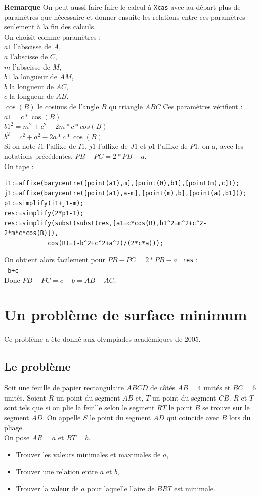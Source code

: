 \documentclass[a4paper,11pt]{book}
\begin{document}
{\bf Remarque}
On peut aussi faire faire le calcul \`a {\tt Xcas} avec au d\'epart plus de 
param\`etres que n\'ecessaire et donner ensuite les relations entre ces 
param\`etres seulement \`a la fin des calculs.\\
On choisit comme param\`etres :\\
$a1$ l'abscisse de $A$,\\
$a$ l'abscisse de $C$,\\
$m$ l'abscisse de $M$,\\
$b1$ la longueur de $AM$,\\
$b$ la longueur de $AC$,\\
$c$ la longueur de $AB$.\\
$\cos(B)$ le cosinus de l'angle $B$ qu triangle $ABC$
Ces param\`etres v\'erifient :\\
$a1=c*\cos(B)$\\
$b1^2=m^2+c^2-2m*c*cos(B)$\\
$b^2=c^2+a^2-2a*c*\cos(B)$\\
Si on note $i1$ l'affixe de $I1$, $j1$ l'affixe de $J1$ et $p1$ l'affixe de 
$P1$, on a, avec les notations pr\'ec\'edentes, $PB-PC=2*PB-a$.\\
On tape :
\begin{verbatim}
i1:=affixe(barycentre([point(a1),m],[point(0),b1],[point(m),c]));
j1:=affixe(barycentre([point(a1),a-m],[point(m),b],[point(a),b1]));
p1:=simplify(i1+j1-m);
res:=simplify(2*p1-1);
res:=simplify(subst(subst(res,[a1=c*cos(B),b1^2=m^2+c^2-2*m*c*cos(B)]),
            cos(B)=(-b^2+c^2+a^2)/(2*c*a)));
\end{verbatim}
On obtient alors facilement pour $PB-PC=2*PB-a$={\tt res} :\\
{\tt -b+c}\\
Donc  $PB-PC=c-b=AB-AC$.

\section{Un probl\`eme de surface minimum}
Ce probl\`eme a \`ete donn\'e aux olympiades acad\'emiques de 2005.
\subsection{Le probl\`eme}
Soit une feuille de papier rectangulaire $ABCD$ de c\^ot\'es $AB=4$ unit\'es 
et $BC=6$ unit\'es.
Soient $R$ un point du segment $AB$ et, $T$ un point du segment 
$CB$. $R$ et $T$ sont tels que si on plie la feuille selon le segment $RT$ 
le point $B$ se trouve sur le segment $AD$. On appelle $S$ le point du segment
$AD$ qui coincide avec $B$ lors du pliage.\\
On pose $AR=a$ et $BT=b$.\\
\begin{itemize}
\item Trouver les valeurs minimales et maximales de $a$,
\item Trouver une relation entre $a$ et $b$,
\item Trouver la valeur de $a$ pour laquelle l'aire de $BRT$ est minimale.
\end{itemize}
\end{document}
